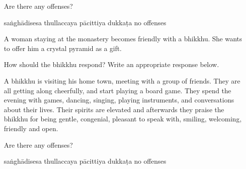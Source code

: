 \begin{exam}{\autoExamName}
\begin{problem}
  Are there any offenses?

  \begin{answers}{5}
    \bChoices
     saṅghādisesa\eAns
     thullaccaya\eAns
     pācittiya\eAns
     dukkaṭa\eAns
     no offenses\eAns
    \eChoices
  \end{answers}

\end{problem}

\problemDivide

\begin{problem}
  A woman staying at the monastery becomes friendly with a bhikkhu.
  She wants to offer him a crystal pyramid as a gift.

  How should the bhikkhu respond? Write an appropriate response below.


\end{problem}

\problemDivide

\begin{problem}

  A bhikkhu is visiting his home town, meeting with a group of friends.
  They are all getting along cheerfully, and start playing a board game.
  They spend the evening with games, dancing, singing, playing instruments, and conversations about their lives.
  Their spirits are elevated and afterwards they praise the bhikkhu for being
  gentle, congenial, pleasant to speak with, smiling, welcoming, friendly and open.

  Are there any offenses?

  \begin{answers}{5}
    \bChoices
     saṅghādisesa\eAns
     thullaccaya\eAns
     pācittiya\eAns
     dukkaṭa\eAns
     no offenses\eAns
    \eChoices
  \end{answers}

\end{problem}


\end{exam}


